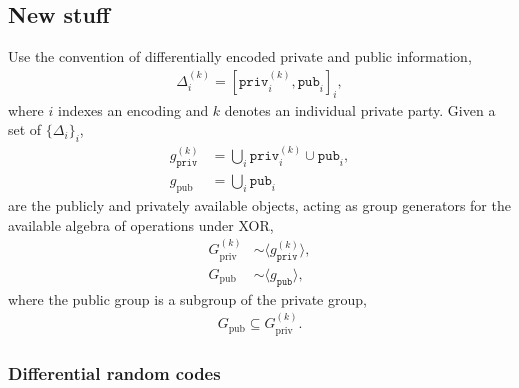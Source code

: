\documentclass[twocolumn, aps, amsmath, amssymb, nofootinbib, superscriptaddress, longbibliography, doublefloatfix, table-of-contents, eqsecnum, rmp]{revtex4-2}
\begin{document}
\subsection{New stuff}

Use the convention of differentially encoded private and public information,
\begin{align}
	\Delta_i^{(k)} = [\mathtt{priv}_i^{(k)},\mathtt{pub}_i]_i,
\end{align}
where $i$ indexes an encoding and $k$ denotes an individual private party. Given a set of $\{\Delta_i\}_i$,
\begin{align}
	g_\mathtt{priv}^{(k)} &= \bigcup_i \mathtt{priv}_i^{(k)} \cup \mathtt{pub}_i,\nonumber\\
	g_\mathrm{pub} &=  \bigcup_i \mathtt{pub}_i
\end{align}
are the publicly and privately available objects, acting as group generators for the available algebra of operations under XOR,
\begin{align}
	G_\mathrm{priv}^{(k)} &\sim \langle g_\mathtt{priv}^{(k)} \rangle, \nonumber\\
	G_\mathrm{pub} &\sim \langle g_\mathtt{pub} \rangle,
\end{align}
where the public group is a subgroup of the private group,
\begin{align}
	G_\mathrm{pub} \subseteq G_\mathrm{priv}^{(k)}.
\end{align}

\subsubsection{Differential random codes}
\end{document}
